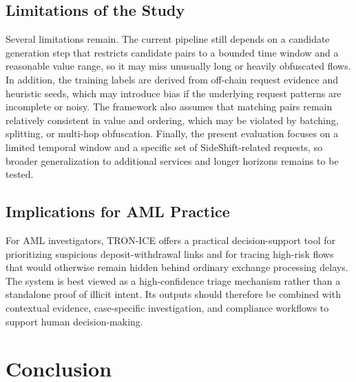 \documentclass[journal]{IEEEtran}
\begin{document}
    \subsection{Limitations of the Study}
    
    Several limitations remain. The current pipeline still depends on a candidate generation step that restricts candidate pairs to a bounded time window and a reasonable value range, so it may miss unusually long or heavily obfuscated flows. In addition, the training labels are derived from off-chain request evidence and heuristic seeds, which may introduce bias if the underlying request patterns are incomplete or noisy. The framework also assumes that matching pairs remain relatively consistent in value and ordering, which may be violated by batching, splitting, or multi-hop obfuscation. Finally, the present evaluation focuses on a limited temporal window and a specific set of SideShift-related requests, so broader generalization to additional services and longer horizons remains to be tested.
    
    \subsection{Implications for AML Practice}
    
    For AML investigators, TRON-ICE offers a practical decision-support tool for prioritizing suspicious deposit-withdrawal links and for tracing high-risk flows that would otherwise remain hidden behind ordinary exchange processing delays. The system is best viewed as a high-confidence triage mechanism rather than a standalone proof of illicit intent. Its outputs should therefore be combined with contextual evidence, case-specific investigation, and compliance workflows to support human decision-making.
    
    \section{Conclusion}
    \label{sec:conclusion}
    
\end{document}
